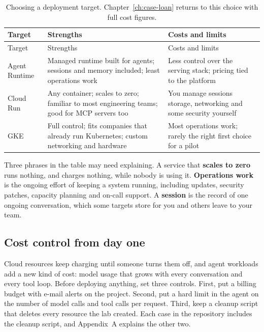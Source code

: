 \begingroup
\small
\begin{xltabular}{\textwidth}{@{}>{\raggedright\arraybackslash}p{2.3cm}>{\raggedright\arraybackslash}X>{\raggedright\arraybackslash}X@{}}
\caption{Choosing a deployment target. Chapter~\ref{ch:case-loan} returns to this choice with full cost figures.}\label{tab:targets}\\
\toprule
Target & Strengths & Costs and limits \\
\midrule
\endfirsthead
\toprule
Target & Strengths & Costs and limits \\
\midrule
\endhead
Agent Runtime & Managed runtime built for agents; sessions and memory included; least operations work & Less control over the serving stack; pricing tied to the platform \\
Cloud Run & Any container; scales to zero; familiar to most engineering teams; good for MCP servers too & You manage sessions storage, networking and some security yourself \\
GKE & Full control; fits companies that already run Kubernetes; custom networking and hardware & Most operations work; rarely the right first choice for a pilot \\
\bottomrule
\end{xltabular}
\endgroup

Three phrases in the table may need explaining. A service that \textbf{scales to zero} runs nothing, and charges nothing, while nobody is using it. \textbf{Operations work} is the ongoing effort of keeping a system running, including updates, security patches, capacity planning and on-call support. A \textbf{session} is the record of one ongoing conversation, which some targets store for you and others leave to your team.


\subsection{Cost control from day one}

\begin{watchout}
Cloud resources keep charging until someone turns them off, and agent workloads add a new kind of cost: model usage that grows with every conversation and every tool loop. Before deploying anything, set three controls. First, put a billing budget with e-mail alerts on the project. Second, put a hard limit in the agent on the number of model calls and tool calls per request. Third, keep a cleanup script that deletes every resource the lab created. Each case in the repository includes the cleanup script, and Appendix~A explains the other two.
\end{watchout}

